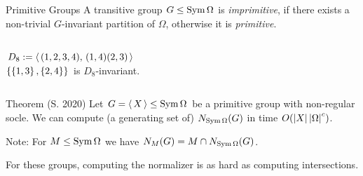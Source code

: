 \documentclass{beamer}
\theoremstyle{plain}
\theoremstyle{definition}
\begin{document}
\begin{frame}{Primitive Groups}
A transitive group $G \leq \operatorname{Sym} \Omega$ is
\emph{imprimitive}, if there exists a non-trivial $G$-invariant partition of
$\Omega$,
otherwise it is \emph{primitive}.

\begin{columns}
\begin{column}{0.5\textwidth}
$D_8 :=  \left\langle \,  (1,2,3,4),\, (1,4)(2,3)  \, \right\rangle $
\\[1em]

$ \left\{   \left\{ 1,3 \right\} ,  \left\{ 2,4 \right\}   \right\} $ is $D_8$-invariant.
\end{column}
\begin{column}{0.3\textwidth}
{
}
\end{column}
\end{columns}
\end{frame}

\begin{frame}%
\begin{block}{Theorem (S. 2020)}
Let $G =  \left\langle \, X \, \right\rangle  \leq \operatorname{Sym} \Omega$ be a primitive group
with non-regular socle.
We can compute (a generating set of) $N_{\operatorname{Sym} \Omega}(G)$
in time $O( \left| X \right|   \left| \Omega \right|  ^ c)$.
\end{block}
\vspace{1em}
\pause
Note: For $M \leq \operatorname{Sym} \Omega$ we have
$N_{M}(G) = M \cap N_{\operatorname{Sym} \Omega}(G)$.

\vspace{1em}
\pause
For these groups, computing the normalizer is as hard as computing
intersections.
\end{frame}
\end{document}
